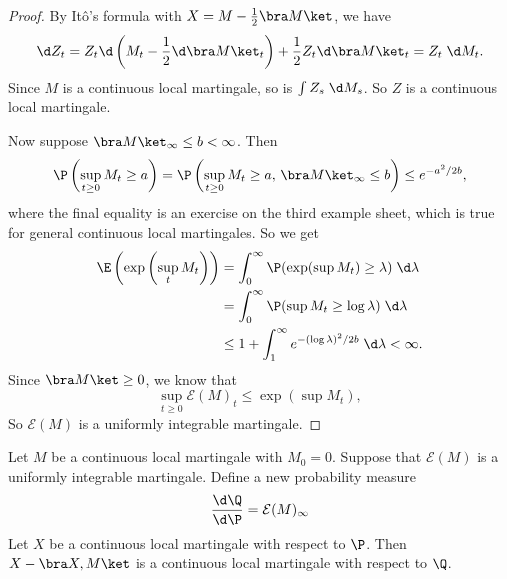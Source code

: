 \documentclass[a4paper]{article}
\begin{document}
\begin{proof}
  By It\^o's formula with $X = M - \frac{1}{2} \bra M\ket$, we have
  \[
    \d Z_t = Z_t \d \left(M_t - \frac{1}{2} \d \bra M\ket_t\right) + \frac{1}{2} Z_t \d \bra M\ket_t = Z_t \;\d M_t.
  \]
  Since $M$ is a continuous local martingale, so is $\int Z_s \;\d M_s$. So $Z$ is a continuous local martingale.

  Now suppose $\bra M\ket_\infty \leq b < \infty$. Then
  \[
    \P \left(\sup_{t \geq 0} M_t \geq a\right) = \P \left(\sup_{t \geq 0} M_t \geq a,\, \bra M\ket_\infty \leq b\right) \leq e^{-a^2/2b},
  \]
  where the final equality is an exercise on the third example sheet, which is true for general continuous local martingales. So we get
  \begin{align*}
    \E \left(\exp \left(\sup_t M_t\right)\right) &= \int_0^\infty \P(\exp (\sup M_t)\geq \lambda)\;\d \lambda \\
    &= \int_0^\infty \P (\sup M_t \geq \log \lambda)\;\d \lambda\\
    &\leq 1 + \int_1^\infty e^{-(\log \lambda)^2/2b} \;\d \lambda < \infty.
  \end{align*}
  Since $\bra M\ket \geq 0$, we know that
  \[
    \sup_{t \geq 0} \mathcal{E}(M)_t \leq \exp \left(\sup M_t\right),
  \]
  So $\mathcal{E}(M)$ is a uniformly integrable martingale.
\end{proof}

\begin{thm}
  Let $M$ be a continuous local martingale with $M_0 = 0$. Suppose that $\mathcal{E}(M)$ is a uniformly integrable martingale. Define a new probability measure
  \[
    \frac{\d \Q}{\d \P} = \mathcal{E}(M)_\infty
  \]
  Let $X$ be a continuous local martingale with respect to $\P$. Then $X - \bra X, M\ket$ is a continuous local martingale with respect to $\Q$.
\end{thm}
\end{document}
